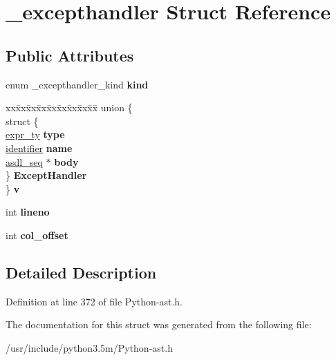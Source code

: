 \hypertarget{struct__excepthandler}{}\section{\+\_\+excepthandler Struct Reference}
\label{struct__excepthandler}
\subsection*{Public Attributes}
\begin{DoxyCompactItemize}
\item 
enum \+\_\+excepthandler\+\_\+kind {\bfseries kind}\hypertarget{struct__excepthandler_a4b560643cf632a1a95ad8233043fa642}{}\label{struct__excepthandler_a4b560643cf632a1a95ad8233043fa642}

\item 
\begin{tabbing}
xx\=xx\=xx\=xx\=xx\=xx\=xx\=xx\=xx\=\kill
union \{\\
\>struct \{\\
\>\>\hyperlink{struct__expr}{expr\_ty} {\bfseries type}\\
\>\>\hyperlink{struct__object}{identifier} {\bfseries name}\\
\>\>\hyperlink{structasdl__seq}{asdl\_seq} $\ast$ {\bfseries body}\\
\>\} {\bfseries ExceptHandler}\\
\} {\bfseries v}\hypertarget{struct__excepthandler_a1ea5f7e0a5c0d1450734d64f382bffd1}{}\label{struct__excepthandler_a1ea5f7e0a5c0d1450734d64f382bffd1}
\\

\end{tabbing}\item 
int {\bfseries lineno}\hypertarget{struct__excepthandler_af779ad209161de4fa7e27838cc5f7fa3}{}\label{struct__excepthandler_af779ad209161de4fa7e27838cc5f7fa3}

\item 
int {\bfseries col\+\_\+offset}\hypertarget{struct__excepthandler_a418f55219dd2c9a2871ec62133d11b8f}{}\label{struct__excepthandler_a418f55219dd2c9a2871ec62133d11b8f}

\end{DoxyCompactItemize}


\subsection{Detailed Description}


Definition at line 372 of file Python-\/ast.\+h.



The documentation for this struct was generated from the following file\+:\begin{DoxyCompactItemize}
\item 
/usr/include/python3.\+5m/Python-\/ast.\+h\end{DoxyCompactItemize}
